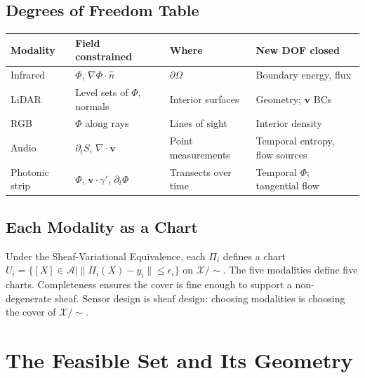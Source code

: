 \documentclass[12pt, oneside]{article}
\newcommand{\Xmod}{\mathcal{X}/{\sim}}
\begin{document}
\subsection{Degrees of Freedom Table}

\begin{center}
\begin{tabular}{llll}
\toprule
\textbf{Modality} & \textbf{Field constrained} & \textbf{Where} &
\textbf{New DOF closed} \\
\midrule
Infrared & $\Phi$, $\nabla\Phi \cdot \hat{n}$ & $\partial\Omega$ &
Boundary energy, flux \\
LiDAR & Level sets of $\Phi$, normals & Interior surfaces &
Geometry; $\mathbf{v}$ BCs \\
RGB & $\Phi$ along rays & Lines of sight &
Interior density \\
Audio & $\partial_t S$, $\nabla \cdot \mathbf{v}$ & Point measurements &
Temporal entropy, flow sources \\
Photonic strip & $\Phi$, $\mathbf{v} \cdot \gamma'$, $\partial_t \Phi$ &
Transects over time & Temporal $\Phi$; tangential flow \\
\bottomrule
\end{tabular}
\end{center}

\subsection{Each Modality as a Chart}

Under the Sheaf-Variational Equivalence, each $\Pi_i$ defines a chart
$U_i = \{[X] \in \mathcal{A} \mid \|\Pi_i(X) - y_i\| \le \epsilon_i\}$ on $\Xmod$.
The five modalities define five charts. Completeness ensures the cover is fine enough
to support a non-degenerate sheaf. Sensor design is sheaf design: choosing modalities
is choosing the cover of $\Xmod$.

\section{The Feasible Set and Its Geometry}
\label{sec:feasible}
\end{document}
